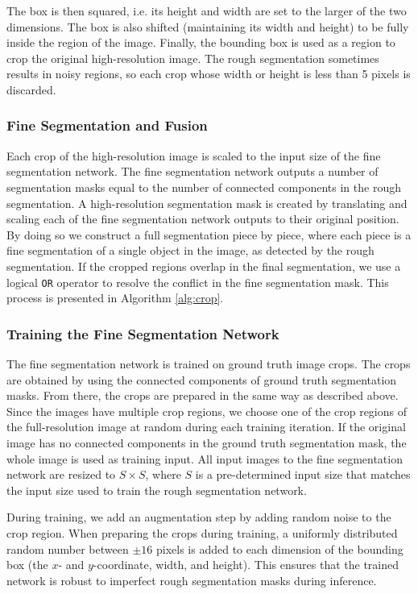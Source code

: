 The box is then squared, i.e. its height and width are set to the larger of the two dimensions. The box is also shifted (maintaining its width and height) to be fully inside the region of the image. Finally, the bounding box is used as a region to crop the original high-resolution image. The rough segmentation sometimes results in noisy regions, so each crop whose width or height is less than 5 pixels is discarded.

\pagebreak

\subsubsection{Fine Segmentation and Fusion}

Each crop of the high-resolution image is scaled to the input size of the fine segmentation network. The fine segmentation network outputs a number of segmentation masks equal to the number of connected components in the rough segmentation. A high-resolution segmentation mask is created by translating and scaling each of the fine segmentation network outputs to their original position. By doing so we construct a full segmentation piece by piece, where each piece is a fine segmentation of a single object in the image, as detected by the rough segmentation. If the cropped regions overlap in the final segmentation, we use a logical \verb|OR| operator to resolve the conflict in the fine segmentation mask. This process is presented in Algorithm \ref{alg:crop}.

\subsubsection{Training the Fine Segmentation Network}

The fine segmentation network is trained on ground truth image crops. The crops are obtained by using the connected components of ground truth segmentation masks. From there, the crops are prepared in the same way as described above. Since the images have multiple crop regions, we choose one of the crop regions of the full-resolution image at random during each training iteration. If the original image has no connected components in the ground truth segmentation mask, the whole image is used as training input. All input images to the fine segmentation network are resized to $S \times S$, where $S$ is a pre-determined input size that matches the input size used to train the rough segmentation network.

During training, we add an augmentation step by adding random noise to the crop region. When preparing the crops during training, a uniformly distributed random number between $\pm16$ pixels is added to each dimension of the bounding box (the $x$- and $y$-coordinate, width, and height). This ensures that the trained network is robust to imperfect rough segmentation masks during inference.

